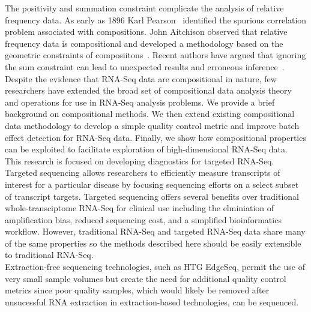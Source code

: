 \documentclass{article}\usepackage[]{graphicx}\usepackage[]{color}
\theoremstyle{definition}
\begin{document}
The positivity and summation constraint complicate the analysis of relative frequency data.  As early as 1896 Karl Pearson~\cite{Pearson1896} identified the spurious correlation problem associated with compositions.  John Aitchison observed that relative frequency data is compositional and developed a methodology based on the geometric constraints of composiitons~\cite{Aitchison1986}.  Recent authors have argued that ignoring the sum constraint can lead to unexpected results and erroneous inference~\cite{Lovell2011}.  Despite the evidence that RNA-Seq data are compositional in nature, few researchers have extended the broad set of compositional data analysis theory and operations for use in RNA-Seq analysis problems.  We provide a brief background on compositional methods.  We then extend existing compositional data methodology to develop a simple quality control metric and improve batch effect detection for RNA-Seq data. Finally, we show how compositional properties can be exploited to facilitate exploration of high-dimensional RNA-Seq data.\\


This research is focused on developing diagnostics for targeted RNA-Seq.  Targeted sequencing allows researchers to efficiently measure transcripts of interest for a particular disease by focusing sequencing efforts on a select subset of transcript targets.  Targeted sequencing offers several benefits over traditional whole-transciptome RNA-Seq for clinical use including the elminiation of amplification bias, reduced sequencing cost, and a simplified bioinformatics workflow.  However, traditional RNA-Seq and targeted RNA-Seq data share many of the same properties so the methods described here should be easily extensible to traditional RNA-Seq.\\

Extraction-free sequencing technologies, such as HTG EdgeSeq, permit the use of very small sample volumes but create the need for additional quality control metrics since poor quality samples, which would likely be removed after unsucessful RNA extraction in extraction-based technologies, can be sequenced.\\ %
\end{document}

